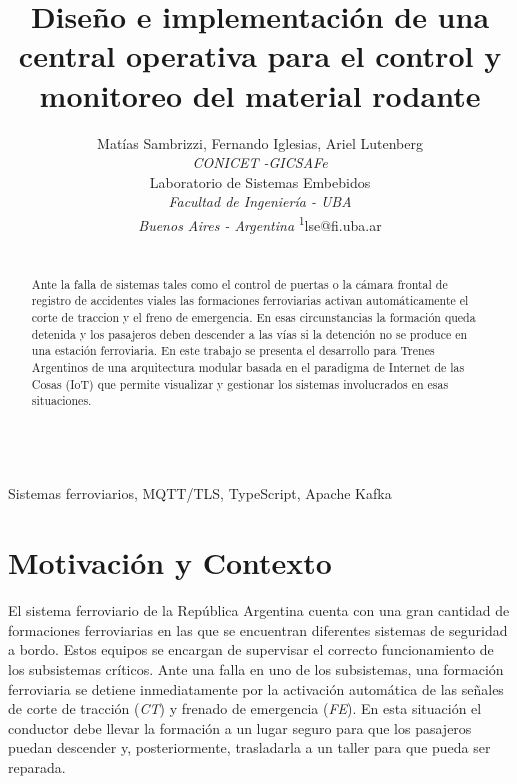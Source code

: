 \documentclass[a4paper]{IEEEtran}
\begin{document}
\title{Diseño e implementación de una central operativa para el control y monitoreo del material rodante}



\author{

Matías Sambrizzi, 
Fernando Iglesias, 
Ariel Lutenberg \\

\normalsize \textit{CONICET -GICSAFe} \\
Laboratorio de Sistemas Embebidos \\
\textit{Facultad de Ingeniería - UBA} \\
\textit{Buenos Aires - Argentina}
\textsuperscript{1}\small lse@fi.uba.ar \\

}


\maketitle

\begin{abstract}
\\
Ante la falla de sistemas tales como el control de puertas o la cámara frontal de registro de accidentes viales las formaciones ferroviarias activan automáticamente el corte de traccion y el freno de emergencia. En esas circunstancias la formación queda detenida y los pasajeros deben descender a las vías si la detención no se produce en una estación ferroviaria. En este trabajo se presenta el desarrollo para Trenes Argentinos de una arquitectura modular basada en el paradigma de Internet de las Cosas (IoT) que permite visualizar y gestionar los sistemas involucrados en esas situaciones.
\end{abstract}


\begin{IEEEkeywords}
\\
Sistemas ferroviarios, MQTT/TLS, TypeScript, Apache Kafka
\end{IEEEkeywords}


\section{Motivación y Contexto}

El sistema ferroviario de la República Argentina cuenta con una gran cantidad de formaciones ferroviarias en las que se encuentran diferentes sistemas de seguridad a bordo. Estos equipos se encargan de supervisar el correcto funcionamiento de los subsistemas críticos. Ante una falla en uno de los subsistemas, una formación ferroviaria se detiene inmediatamente por la activación automática de las señales de corte de tracción (\textit{CT}) y frenado de emergencia (\textit{FE}). En esta situación el conductor debe llevar la formación a un lugar seguro para que los pasajeros puedan descender y, posteriormente, trasladarla a un taller para que pueda ser reparada.
\end{document}
